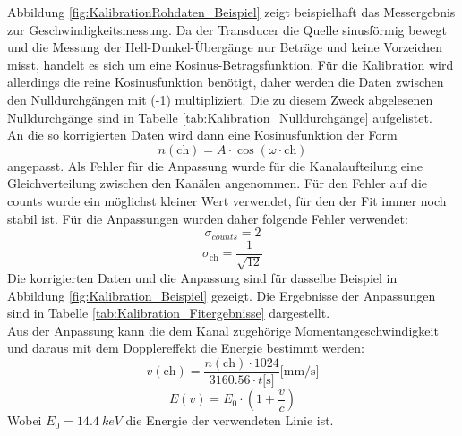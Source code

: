 \documentclass[12pt,a4paper]{article}
\begin{document}
Abbildung \ref{fig:KalibrationRohdaten_Beispiel} zeigt beispielhaft das Messergebnis zur Geschwindigkeitsmessung. Da der Transducer die Quelle sinusförmig bewegt und die Messung der Hell-Dunkel-Übergänge nur Beträge und keine Vorzeichen misst, handelt es sich um eine Kosinus-Betragsfunktion. Für die Kalibration wird allerdings die reine Kosinusfunktion benötigt, daher werden die Daten zwischen den Nulldurchgängen mit (-1) multipliziert. Die zu diesem Zweck abgelesenen Nulldurchgänge sind in Tabelle \ref{tab:Kalibration_Nulldurchgänge} aufgelistet. \\
An die so korrigierten Daten wird dann eine Kosinusfunktion der Form
\begin{equation*}
n(\textrm{ch}) = A \cdot \cos (\omega \cdot \textrm{ch})
\end{equation*}
angepasst. Als Fehler für die Anpassung wurde für die Kanalaufteilung eine Gleichverteilung zwischen den Kanälen angenommen. Für den Fehler auf die counts wurde ein möglichst kleiner Wert verwendet, für den der Fit immer noch stabil ist. Für die Anpassungen wurden daher folgende Fehler verwendet:
\begin{equation*}
\sigma _{counts} = 2
\end{equation*}
\begin{equation*}
\sigma _\textrm{ch} = \dfrac{1}{\sqrt{12}}
\end{equation*}
Die korrigierten Daten und die Anpassung sind für dasselbe Beispiel in Abbildung \ref{fig:Kalibration_Beispiel} gezeigt. Die Ergebnisse der Anpassungen sind in Tabelle \ref{tab:Kalibration_Fitergebnisse} dargestellt. \\
Aus der Anpassung kann die dem Kanal zugehörige Momentangeschwindigkeit und daraus mit dem Dopplereffekt die Energie bestimmt werden:
\begin{equation*}
v(\textrm{ch}) = \dfrac{n(\textrm{ch}) \cdot 1024}{3160.56 \cdot t \textrm{[s]}} \textrm{[mm/s]}
\end{equation*}
\begin{equation*}
E(v) = E_0 \cdot \left(1 + \dfrac{v}{c}\right)
\end{equation*}
Wobei $E_0 = \SI{14,4}{keV}$ die Energie der verwendeten Linie ist.
\end{document}
